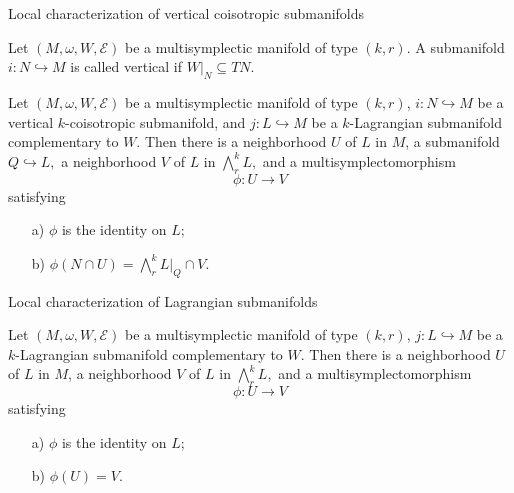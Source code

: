 \begin{frame}{Local characterization of vertical coisotropic submanifolds}
    \begin{definition} Let $(M, \omega, W, \mathcal{E})$ be a multisymplectic manifold of type $(k,r).$ A submanifold $i:N \hookrightarrow M$ is called \alert{vertical} if $W|_N \subseteq TN.$
    \end{definition}
    \pause
    \begin{theorem} Let $(M, \omega, W, \mathcal{E})$ be a multisymplectic manifold of type $(k,r)$, $i: N \hookrightarrow M$ be a vertical $k$-coisotropic submanifold, and $j:L \hookrightarrow M$ be a $k$-Lagrangian submanifold complementary to $W$. Then there is a neighborhood $U$ of $L$ in $M$, a submanifold $Q \hookrightarrow L,$ a neighborhood $V$ of $L$ in $\bigwedge^k_r L,$ and a multisymplectomorphism $$\phi: U \rightarrow V$$ satisfying
    \begin{itemize}
        \item[a)] $\phi$ is the identity on $L;$
        \item[b)] $\phi(N \cap U) = \bigwedge^k_r L \big |_Q \cap V.$
    \end{itemize}
    \end{theorem}
\end{frame}
\begin{frame}{Local characterization of Lagrangian submanifolds}
    \begin{theorem} Let $(M, \omega, W, \mathcal{E})$ be a multisymplectic manifold of type $(k,r)$, $j:L \hookrightarrow M$ be a $k$-Lagrangian submanifold complementary to $W$. Then there is a neighborhood $U$ of $L$ in $M$, a neighborhood $V$ of $L$ in $\bigwedge^k_r L,$ and a multisymplectomorphism $$\phi: U \rightarrow V$$ satisfying
        \begin{itemize}
            \item[a)] $\phi$ is the identity on $L;$
            \item[b)] $\phi( U) =  V.$
        \end{itemize}
        \end{theorem} 
\end{frame}
